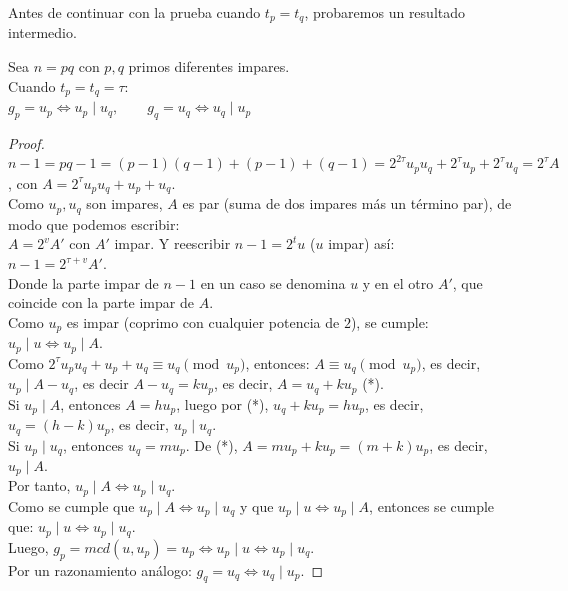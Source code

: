 Antes de continuar con la prueba cuando $t_p = t_q$, probaremos un resultado intermedio.

\begin{enunciado} [Auxiliar]\label{enun:auxiliar}\leavevmode\par 
Sea $n=pq$ con $p,q$ primos diferentes impares. \\
Cuando $t_p=t_q=\tau$: \\
$g_p=u_p \iff u_p \mid u_q, \qquad g_q=u_q \iff u_q \mid u_p$
\end{enunciado}

\begin{proof}
$n-1 = pq-1 = (p-1)(q-1)+(p-1)+(q-1) = 2^{2\tau} u_p u_q + 2^\tau u_p + 2^\tau u_q = 2^\tau A$, con $A = 2^\tau u_p u_q + u_p + u_q$. \\ 
Como $u_p,u_q$ son impares, $A$ es par (suma de dos impares más un término par), de modo que podemos escribir: \\
$A=2^{v}A'$ con $A'$ impar. Y reescribir $n-1=2^tu$ ($u$ impar) así: \\
$n-1=2^{\tau+v}A'$. \\
Donde la parte impar de $n-1$ en un caso se denomina $u$ y en el otro $A'$, que coincide con la parte impar de $A$. \\ 
Como $u_p$ es impar (coprimo con cualquier potencia de $2$), se cumple: \\
$u_p\mid u \iff u_p\mid A$. \\
Como $2^\tau u_pu_q+u_p+u_q \equiv u_q \pmod {u_p}$, entonces: $A\equiv u_q \pmod {u_p}$, es decir, $u_p \mid A-u_q$, es decir $A-u_q = ku_p$, es decir, $A=u_q+ku_p$ \qquad (*).\\
Si $u_p\mid A$, entonces $A=hu_p$, luego por (*), $u_q+ku_p= hu_p$, es decir, $u_q=(h-k)u_p$, es decir, $u_p \mid u_q$. \\
Si $u_p \mid u_q$, entonces $u_q = mu_p$. De (*), $A = mu_p+ku_p = (m+k)u_p$, es decir, $u_p \mid A$. \\
Por tanto, $u_p \mid A \iff u_p \mid u_q$. \\
Como se cumple que $u_p \mid A \iff u_p \mid u_q$ y que $u_p\mid u \iff u_p\mid A$, entonces se cumple que: $u_p\mid u \iff u_p\mid u_q$. \\
Luego, $g_p=mcd(u,u_p)=u_p \iff u_p\mid u \iff u_p\mid u_q$. \\
Por un razonamiento análogo: $g_q=u_q \iff u_q\mid u_p$.
\end{proof}

